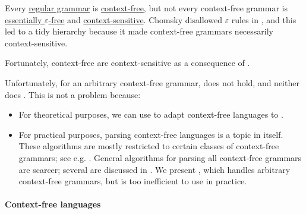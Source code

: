 \begin{remark}\label{rem:chomsky_hierarchy_failure}
  Every \hyperref[def:chomsky_hierarchy/regular]{regular grammar} is \hyperref[def:chomsky_hierarchy/context_free]{context-free}, but not every context-free grammar is \hyperref[def:epsilon_free_grammar]{essentially \( \varepsilon \)-free} and \hyperref[def:chomsky_hierarchy/context_sensitive]{context-sensitive}. Chomsky disallowed \( \varepsilon \) rules in \cite[def. 6]{Chomsky1959}, and this led to a tidy hierarchy because it made context-free grammars necessarily context-sensitive.

  Fortunately, context-free  are context-sensitive as a consequence of .

  Unfortunately, for an arbitrary context-free grammar,  does not hold, and neither does . This is not a problem because:
  \begin{itemize}
    \item For theoretical purposes, we can use  to adapt context-free languages to .

    \item For practical purposes, parsing context-free languages is a topic in itself. These algorithms are mostly restricted to certain classes of context-free grammars; see e.g. \cite[ch. 6]{Salomaa1987}. General algorithms for parsing all context-free grammars are scarcer; several are discussed in \cite{Economopoulos2006}. We present , which handles arbitrary context-free grammars, but is too inefficient to use in practice.
  \end{itemize}
\end{remark}

\paragraph{Context-free languages}

